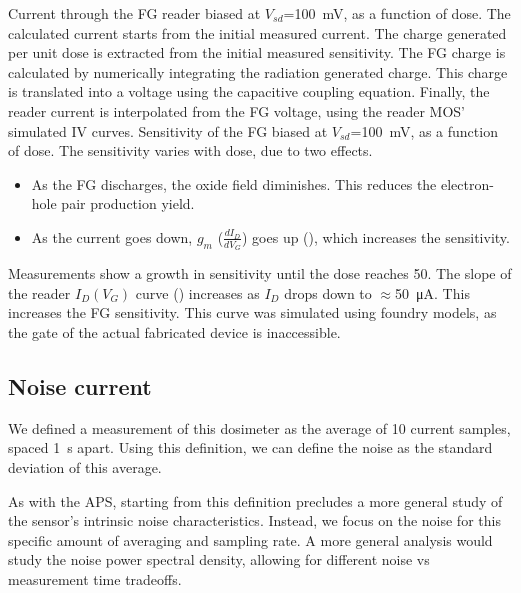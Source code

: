 {Current through the FG reader biased at 
    $V_{sd}$=\SI{100}{\milli\volt}, as a function of dose.
The calculated current starts from the initial measured current.
The charge generated per unit dose is extracted from the initial measured sensitivity.
The FG charge is calculated by numerically integrating the radiation generated charge.
This charge is translated into a voltage using the capacitive coupling equation.
Finally, the reader current is interpolated from the FG voltage,
using the reader MOS' simulated IV curves.}
{Sensitivity of the FG biased at 
    $V_{sd}$=\SI{100}{\milli\volt}, as a function of dose.
}
The sensitivity varies with dose, due to two effects.
\begin{itemize}
    \item As the FG discharges, the oxide field diminishes.
        This reduces the electron-hole pair production yield.
    \item As the current goes down, $g_m$ ($\frac{dI_D}{dV_G}$) goes up
        (), which increases the sensitivity.
\end{itemize}
Measurements show a growth in sensitivity until the dose reaches
\SI{50}{\Gray}.
{The slope of the reader $I_D(V_G)$ curve () 
increases as $I_D$ drops down to 
$\approx$\SI{50}{\micro\ampere}.
This increases the FG sensitivity.
This curve was simulated using foundry models,
as the gate of the actual fabricated device is inaccessible.
}
\subsection{Noise current}
We defined a measurement of this dosimeter as the average of 10 current samples,
spaced \SI{1}{\second} apart.
Using this definition, we can define the noise as the standard deviation of this average.

As with the APS, starting from this definition precludes a more general study
of the sensor's intrinsic noise characteristics.
Instead, we focus on the noise for this specific amount of averaging and sampling rate.
A more general analysis would study the noise power spectral density,
allowing for different noise vs measurement time tradeoffs.

